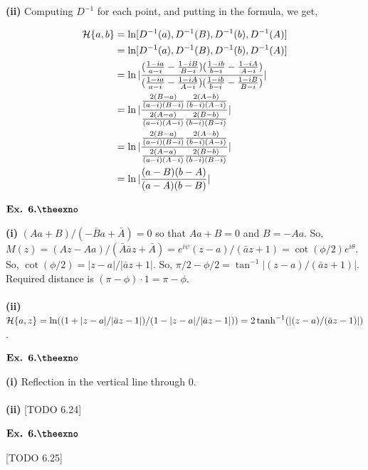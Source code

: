 \documentclass{article}
\def\tf{\textbf}
\def\mc{\ensuremath\mathcal}
\newcounter{exno}
\begin{document}
\tf{(ii)} Computing $D^{-1}$ for each point, and putting in the formula, we get,

\begin{align*}
    \mc{H}\{a,b\} &= \ln[D^{-1}(a),D^{-1}(B),D^{-1}(b),D^{-1}(A)]\\
    &= \ln[D^{-1}(a),D^{-1}(B),D^{-1}(b),D^{-1}(A)]\\
    &= \ln|\frac{(\frac{1-ia}{a-i} - \frac{1-iB}{B-i})(\frac{1-ib}{b-i} - \frac{1-iA}{A-i})}{(\frac{1-ia}{a-i} - \frac{1-iA}{A-i})(\frac{1-ib}{b-i} - \frac{1-iB}{B-i})}|\\
    &= \ln |\frac{\frac{2(B-a)}{(a-i)(B-i)}\frac{2(A-b)}{(b-i)(A-i)}}{\frac{2(A-a)}{(a-i)(A-i)}\frac{2(B-b)}{(b-i)(B-i)}}|\\
    &= \ln |\frac{\frac{2(B-a)}{(a-i)(B-i)}\frac{2(A-b)}{(b-i)(A-i)}}{\frac{2(A-a)}{(a-i)(A-i)}\frac{2(B-b)}{(b-i)(B-i)}}|\\
    &= \ln |\frac{(a-B)(b-A)}{(a-A)(b-B)}|
\end{align*}

\vspace{0.2in}

${\textbf{Ex. 6.\theexno}}$
\addtocounter{exno}{1}

\tf{(i)} $(Aa+B)/(-\bar{B}a+\bar{A}) = 0$ so that $Aa+B = 0$ and $B = -Aa$. So, $M(z) = (Az-Aa)/(\bar{A}\bar{a}z+\bar{A}) = e^{i\psi}(z-a)/(\bar{a}z+1) = \cot(\phi/2)e^{i\theta}$. So, $\cot(\phi/2) = |z-a|/|\bar{a}z+1|$. So, $\pi/2-\phi/2 = \tan^{-1}|(z-a)/(\bar{a}z+1)|$. Required distance is $(\pi-\phi)\cdot 1 = \pi-\phi$.\\~\\

\tf{(ii)} $\mc{H}\{a,z\} = \ln((1+|z-a|/|\bar{a}z-1|)/(1-|z-a|/|\bar{a}z-1|)) = 2\tanh^{-1}(|(z-a)/(\bar{a}z-1)|)$.

\vspace{0.2in}

${\textbf{Ex. 6.\theexno}}$
\addtocounter{exno}{1}

\tf{(i)} Reflection in the vertical line through $0$.\\~\\

\tf{(ii)} [TODO 6.24]

\vspace{0.2in}

${\textbf{Ex. 6.\theexno}}$
\addtocounter{exno}{1}

[TODO 6.25]
\end{document}
